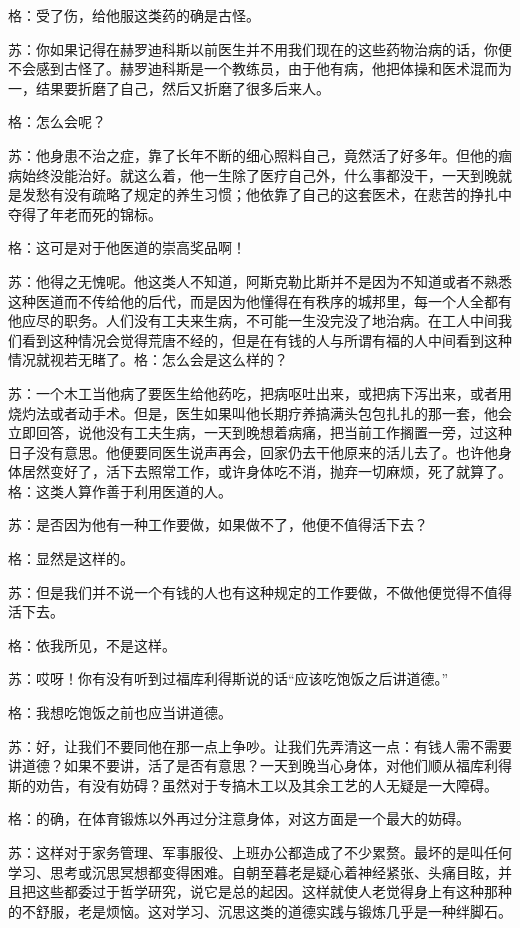 \documentclass[11pt,oneside]{book}
\begin{document}
\begin{common-format}
格：受了伤，给他服这类药的确是古怪。

苏：你如果记得在赫罗迪科斯以前医生并不用我们现在的这些药物治病的话，你便不会感到古怪了。赫罗迪科斯是一个教练员，由于他有病，他把体操和医术混而为一，结果要折磨了自己，然后又折磨了很多后来人。

格：怎么会呢？

苏：他身患不治之症，靠了长年不断的细心照料自己，竟然活了好多年。但他的痼病始终没能治好。就这么着，他一生除了医疗自己外，什么事都没干，一天到晚就是发愁有没有疏略了规定的养生习惯；他依靠了自己的这套医术，在悲苦的挣扎中夺得了年老而死的锦标。

格：这可是对于他医道的崇高奖品啊！

苏：他得之无愧呢。他这类人不知道，阿斯克勒比斯并不是因为不知道或者不熟悉这种医道而不传给他的后代，而是因为他懂得在有秩序的城邦里，每一个人全都有他应尽的职务。人们没有工夫来生病，不可能一生没完没了地治病。在工人中间我们看到这种情况会觉得荒唐不经的，但是在有钱的人与所谓有福的人中间看到这种情况就视若无睹了。格：怎么会是这么样的？

苏：一个木工当他病了要医生给他药吃，把病呕吐出来，或把病下泻出来，或者用烧灼法或者动手术。但是，医生如果叫他长期疗养搞满头包包扎扎的那一套，他会立即回答，说他没有工夫生病，一天到晚想着病痛，把当前工作搁置一旁，过这种日子没有意思。他便要同医生说声再会，回家仍去干他原来的活儿去了。也许他身体居然变好了，活下去照常工作，或许身体吃不消，抛弃一切麻烦，死了就算了。格：这类人算作善于利用医道的人。

苏：是否因为他有一种工作要做，如果做不了，他便不值得活下去？

格：显然是这样的。

苏：但是我们并不说一个有钱的人也有这种规定的工作要做，不做他便觉得不值得活下去。

格：依我所见，不是这样。

苏：哎呀！你有没有听到过福库利得斯说的话“应该吃饱饭之后讲道德。”

格：我想吃饱饭之前也应当讲道德。

苏：好，让我们不要同他在那一点上争吵。让我们先弄清这一点：有钱人需不需要讲道德？如果不要讲，活了是否有意思？一天到晚当心身体，对他们顺从福库利得斯的劝告，有没有妨碍？虽然对于专搞木工以及其余工艺的人无疑是一大障碍。

格：的确，在体育锻炼以外再过分注意身体，对这方面是一个最大的妨碍。

苏：这样对于家务管理、军事服役、上班办公都造成了不少累赘。最坏的是叫任何学习、思考或沉思冥想都变得困难。自朝至暮老是疑心着神经紧张、头痛目眩，并且把这些都委过于哲学研究，说它是总的起因。这样就使人老觉得身上有这种那种的不舒服，老是烦恼。这对学习、沉思这类的道德实践与锻炼几乎是一种绊脚石。


\end{common-format}
\end{document}
